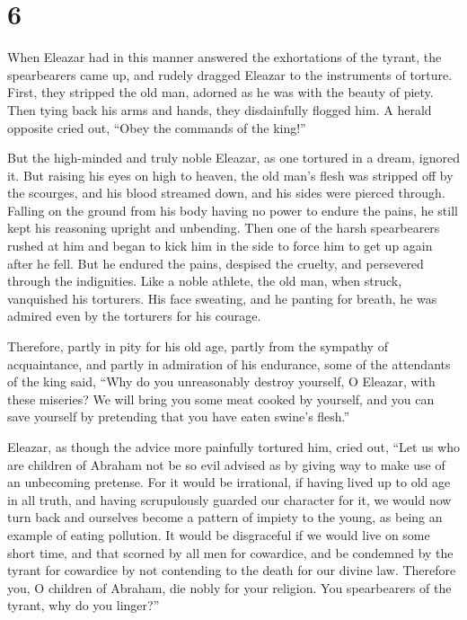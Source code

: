 \hypertarget{section-5}{%
\section{6}\label{section-5}}

 When Eleazar had in this manner answered the exhortations
of the tyrant, the spearbearers came up, and rudely dragged Eleazar to
the instruments of torture.  First, they stripped the old
man, adorned as he was with the beauty of piety.  Then tying
back his arms and hands, they disdainfully flogged him.  A
herald opposite cried out, ``Obey the commands of the king!''

 But the high-minded and truly noble Eleazar, as one
tortured in a dream, ignored it.  But raising his eyes on
high to heaven, the old man's flesh was stripped off by the scourges,
and his blood streamed down, and his sides were pierced through.
 Falling on the ground from his body having no power to
endure the pains, he still kept his reasoning upright and unbending.
 Then one of the harsh spearbearers rushed at him and began
to kick him in the side to force him to get up again after he fell.
 But he endured the pains, despised the cruelty, and
persevered through the indignities.  Like a noble athlete,
the old man, when struck, vanquished his torturers.  His
face sweating, and he panting for breath, he was admired even by the
torturers for his courage.

 Therefore, partly in pity for his old age, 
partly from the sympathy of acquaintance, and partly in admiration of
his endurance, some of the attendants of the king said, 
``Why do you unreasonably destroy yourself, O Eleazar, with these
miseries?  We will bring you some meat cooked by yourself,
and you can save yourself by pretending that you have eaten swine's
flesh.''

 Eleazar, as though the advice more painfully tortured him,
cried out,  ``Let us who are children of Abraham not be so
evil advised as by giving way to make use of an unbecoming pretense.
 For it would be irrational, if having lived up to old age
in all truth, and having scrupulously guarded our character for it, we
would now turn back  and ourselves become a pattern of
impiety to the young, as being an example of eating pollution.
 It would be disgraceful if we would live on some short
time, and that scorned by all men for cowardice,  and be
condemned by the tyrant for cowardice by not contending to the death for
our divine law.  Therefore you, O children of Abraham, die
nobly for your religion.  You spearbearers of the tyrant,
why do you linger?''

